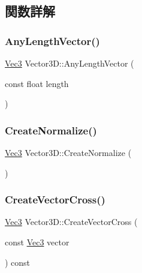 \subsection{関数詳解}
\mbox{\label{class_vector3_d_a030384bdfe25863cd4be77fa73052cf1}} 
\subsubsection{\texorpdfstring{Any\+Length\+Vector()}{AnyLengthVector()}}
{\footnotesize\ttfamily \mbox{\hyperlink{_vector3_d_8h_ab16f59e4393f29a01ec8b9bbbabbe65d}{Vec3}} Vector3\+D\+::\+Any\+Length\+Vector (\begin{DoxyParamCaption}\item[{const float}]{length }\end{DoxyParamCaption})\hspace{0.3cm}{\ttfamily [inline]}}

\mbox{\label{class_vector3_d_ae55e42c07bdfcc6c11bcbc6bf5e27808}} 
\subsubsection{\texorpdfstring{Create\+Normalize()}{CreateNormalize()}}
{\footnotesize\ttfamily \mbox{\hyperlink{_vector3_d_8h_ab16f59e4393f29a01ec8b9bbbabbe65d}{Vec3}} Vector3\+D\+::\+Create\+Normalize (\begin{DoxyParamCaption}{ }\end{DoxyParamCaption})\hspace{0.3cm}{\ttfamily [inline]}}

\mbox{\label{class_vector3_d_accbd42535a385947ac5380084f2c688c}} 
\subsubsection{\texorpdfstring{Create\+Vector\+Cross()}{CreateVectorCross()}}
{\footnotesize\ttfamily \mbox{\hyperlink{_vector3_d_8h_ab16f59e4393f29a01ec8b9bbbabbe65d}{Vec3}} Vector3\+D\+::\+Create\+Vector\+Cross (\begin{DoxyParamCaption}\item[{const \mbox{\hyperlink{_vector3_d_8h_ab16f59e4393f29a01ec8b9bbbabbe65d}{Vec3}}}]{vector }\end{DoxyParamCaption}) const\hspace{0.3cm}{\ttfamily [inline]}}


